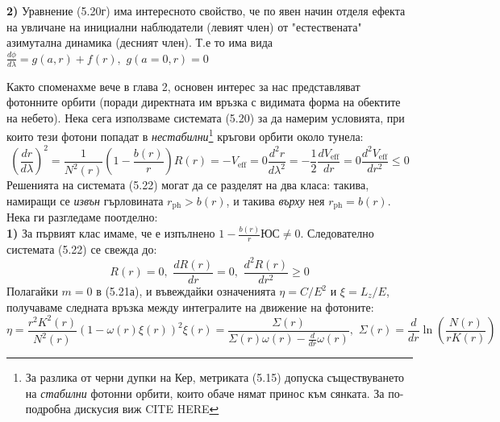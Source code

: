 \noindent\textbf{2)} Уравнение (5.20г) има интересното свойство, че по явен начин отделя ефекта на увличане на инициални наблюдатели (левият член) от "естествената"$\,$ азимутална динамика (десният член). Т.е то има вида $\frac{d\phi}{d\lambda} = g(a,r) + f(r),\,\, g(a = 0, r) = 0$\newpage

Както споменахме вече в глава 2, основен интерес за нас представляват фотонните орбити (поради директната им връзка с видимата форма на обектите на небето). Нека сега използваме системата (5.20) за да намерим условията, при които тези фотони попадат в \emph{нестабилни}\footnote{За разлика от черни дупки на Кер, метриката (5.15) допуска съществуването на \emph{стабилни} фотонни орбити, които обаче нямат принос към сянката. За по-подробна дискусия виж CITE HERE} кръгови орбити около тунела:
\begin{subequations}
	\begin{equation}
	\left(\frac{dr}{d\lambda}\right)^2 = \frac{1}{N^2(r)}\left(1 - \frac{b(r)}{r}\right)R(r) = - V_\text{eff} = 0
	\end{equation}
	\begin{equation}
		\frac{d^2r}{d\lambda^2} = -\frac{1}{2}\frac{dV_{\text{eff}}}{dr} = 0
	\end{equation}
	\begin{equation}
		\frac{d^2V_\text{eff}}{dr^2} \le 0
	\end{equation}
\end{subequations}
Решенията на системата (5.22) могат да се разделят на два класа: такива, намиращи се \emph{извън} гърловината $r_{\text{ph}} > b(r)$, и такива \emph{върху} нея $r_\text{ph} = b(r)$. Нека ги разгледаме поотделно:\\
	
\noindent\textbf{1)} За първият клас имаме, че е изпълнено $1 - \frac{b(r)}{r}ЮС \ne 0$. Следователно системата (5.22) се свежда до:
	\begin{equation}
		R(r) = 0,\,\, \frac{dR(r)}{dr} = 0,\,\, \frac{d^2R(r)}{dr^2} \ge 0
	\end{equation}
	Полагайки $m = 0$ в (5.21а), и въвеждайки означенията $\eta = C / E^2$ и $\xi = L_z / E$, получаваме следната връзка между интегралите на движение на фотоните:
	\begin{subequations}
		\begin{equation}
			\eta = \frac{r^2K^2(r)}{N^2(r)}\left(1 - \omega(r)\xi(r)\right)^2
		\end{equation}
		\begin{equation}
			\xi(r) = \frac{\Sigma(r)}{\Sigma(r)\omega(r) - \frac{d}{dr}\omega(r)},\,\, \Sigma(r) = \frac{d}{dr}\ln\left(\frac{N(r)}{rK(r)}\right)
		\end{equation}
	\end{subequations}

